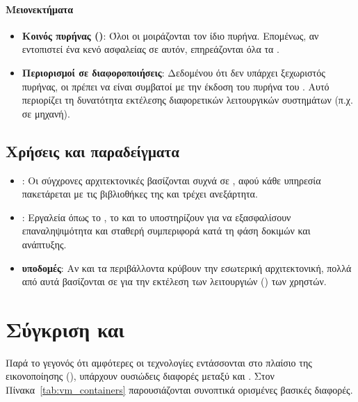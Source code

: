 \paragraph{Μειονεκτήματα}
\begin{itemize}
  \item \textbf{Κοινός πυρήνας ()}: Όλοι οι  μοιράζονται τον ίδιο πυρήνα. Επομένως, αν εντοπιστεί ένα κενό ασφαλείας σε αυτόν, επηρεάζονται όλα τα .
  \item \textbf{Περιορισμοί σε  διαφοροποιήσεις}: Δεδομένου ότι δεν υπάρχει ξεχωριστός πυρήνας, οι  πρέπει να είναι συμβατοί με την έκδοση του πυρήνα του . Αυτό περιορίζει τη δυνατότητα εκτέλεσης διαφορετικών λειτουργικών συστημάτων (π.χ.  σε  μηχανή).
\end{itemize}

\subsection{Χρήσεις και παραδείγματα}

\begin{itemize}
  \item \textbf{}: Οι σύγχρονες αρχιτεκτονικές  βασίζονται συχνά σε , αφού κάθε υπηρεσία πακετάρεται με τις βιβλιοθήκες της και τρέχει ανεξάρτητα.
  \item \textbf{}: Εργαλεία όπως το , το  και το  υποστηρίζουν  για να εξασφαλίσουν επαναληψιμότητα και σταθερή συμπεριφορά κατά τη φάση δοκιμών και ανάπτυξης.
  \item \textbf{ υποδομές}: Αν και τα  περιβάλλοντα κρύβουν την εσωτερική αρχιτεκτονική, πολλά από αυτά βασίζονται σε  για την εκτέλεση των λειτουργιών () των χρηστών.
\end{itemize}

\section{Σύγκριση  και }

Παρά το γεγονός ότι αμφότερες οι τεχνολογίες εντάσσονται στο πλαίσιο της εικονοποίησης (), υπάρχουν ουσιώδεις διαφορές μεταξύ  και . Στον Πίνακα~\ref{tab:vm_containers} παρουσιάζονται συνοπτικά ορισμένες βασικές διαφορές.

